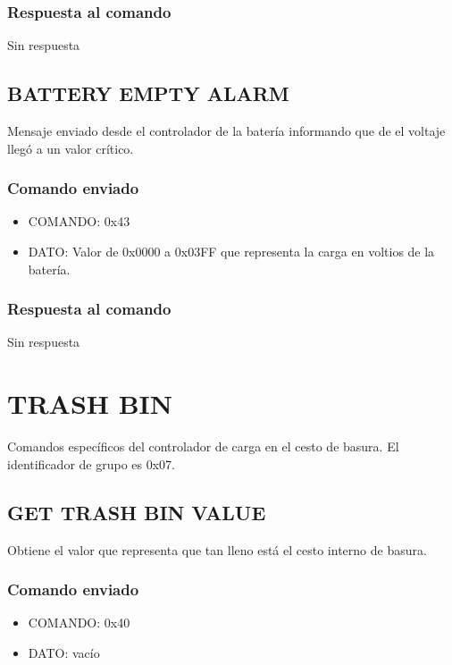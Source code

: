 \documentclass[a4paper,10pt]{article}
\begin{document}
\subsubsection*{Respuesta al comando}

Sin respuesta

\subsection{BATTERY EMPTY ALARM}
\label{battery_empty}

Mensaje enviado desde el controlador de la bater\'ia informando que de el voltaje lleg\'o a un valor cr\'itico.

\subsubsection*{Comando enviado}

\begin{itemize}
	\item{COMANDO:} 0x43
	\item{DATO:} Valor de 0x0000 a 0x03FF que representa la carga en voltios de la bater\'ia.
\end{itemize}

\subsubsection*{Respuesta al comando}

Sin respuesta

\section{TRASH BIN}
\label{grupo_trash_bin}

Comandos espec\'ificos del controlador de carga en el cesto de basura.
El identificador de grupo es 0x07.

\subsection{GET TRASH BIN VALUE}
\label{get_trash_bin_value}

Obtiene el valor que representa que tan lleno est\'a el cesto interno de basura.

\subsubsection*{Comando enviado}

\begin{itemize}
	\item{COMANDO:} 0x40
	\item{DATO:} vac\'io
\end{itemize}
\end{document}
